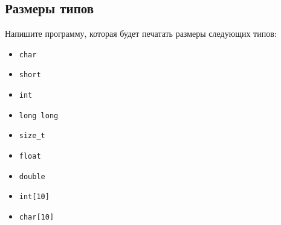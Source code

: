 \documentclass{article}
\begin{document}
\subsection{Размеры типов}
Напишите программу, которая будет печатать размеры следующих типов:
\begin{multicols}{3}
\begin{itemize}
\item \texttt{char}
\item \texttt{short}
\item \texttt{int}
\item \texttt{long long}
\item \texttt{size\_t}
\item \texttt{float}
\item \texttt{double}
\item \texttt{int[10]}
\item \texttt{char[10]}
\end{itemize}
\end{multicols}
\end{document}
